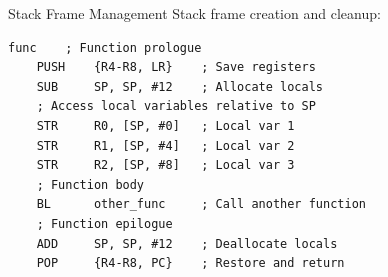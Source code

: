 \begin{example2}{Stack Frame Management} Stack frame creation and cleanup:
\begin{lstlisting}[language=armasm, style=basesmol]
func    ; Function prologue
    PUSH    {R4-R8, LR}    ; Save registers
    SUB     SP, SP, #12    ; Allocate locals
    ; Access local variables relative to SP
    STR     R0, [SP, #0]   ; Local var 1
    STR     R1, [SP, #4]   ; Local var 2
    STR     R2, [SP, #8]   ; Local var 3
    ; Function body
    BL      other_func     ; Call another function
    ; Function epilogue
    ADD     SP, SP, #12    ; Deallocate locals
    POP     {R4-R8, PC}    ; Restore and return
\end{lstlisting}
\end{example2}


















